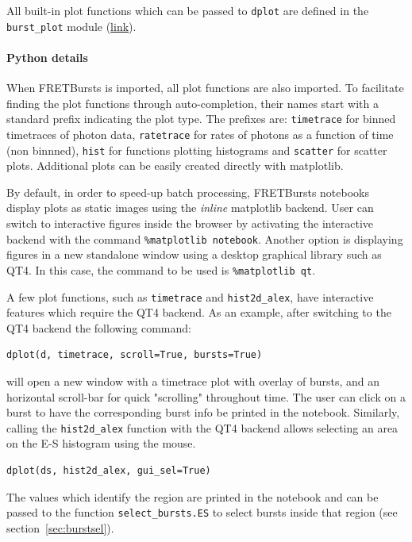 \documentclass[10pt,letterpaper]{article}
\begin{document}
All built-in plot functions which can be passed to
\verb|dplot| are defined in the
\verb|burst_plot| module
(\href{http://fretbursts.readthedocs.org/en/latest/plots.html}{link}).

\paragraph{Python details}
When FRETBursts is imported, all plot functions are also imported.
To facilitate finding the plot functions through auto-completion,
their names start with a standard prefix indicating the
plot type. The prefixes are: \verb|timetrace| for binned timetraces
of photon data, \verb|ratetrace| for rates of photons as a function of time (non
binnned), \verb|hist| for functions plotting histograms and \verb|scatter| for
scatter plots.
Additional plots can be easily created directly with matplotlib.

By default, in order to speed-up batch processing, FRETBursts notebooks display plots
as static images using the \textit{inline} matplotlib backend.
User can switch to interactive figures inside the browser by activating
the interactive backend with the command \verb|%matplotlib notebook|.
Another option is displaying figures in a new standalone window
using a desktop graphical library such as QT4.
In this case, the command to be used is \verb|%matplotlib qt|.

A few plot functions, such as \verb|timetrace| and \verb|hist2d_alex|, have interactive features
which require the QT4 backend. As an example, after switching to the QT4 backend
the following command:

\begin{lstlisting}
dplot(d, timetrace, scroll=True, bursts=True)
\end{lstlisting}

\noindent
will open a new window with a timetrace plot with overlay of bursts, and an horizontal scroll-bar for quick
"scrolling" throughout time. The user can click on a burst to have the corresponding burst info
be printed in the notebook.
Similarly, calling the \verb|hist2d_alex| function with the QT4 backend allows
selecting an area on the E-S histogram using the mouse.

\begin{lstlisting}
dplot(ds, hist2d_alex, gui_sel=True)
\end{lstlisting}

The values which identify the region are printed in the notebook and can be passed
to the function \verb|select_bursts.ES| to select bursts inside that region
(see section~\ref{sec:burstsel}).
\end{document}
